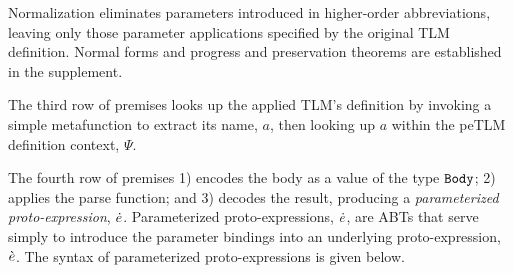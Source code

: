 \documentclass[acmsmall,review,anonymous]{acmart}\settopmatter{printfolios=true,printccs=false,printacmref=false}
\begin{document}
\vspace{-5px}

Normalization eliminates parameters introduced in higher-order abbreviations, leaving only those parameter applications specified by the original TLM definition. Normal forms and progress and preservation theorems are established in the supplement.

The third row of premises looks up the applied TLM's definition by invoking a simple metafunction to extract its name, $a$, then looking up $a$ within the peTLM definition context, $\Psi$.


The fourth row of premises 1) encodes the body as a value of the type $\mathtt{Body}$; 2) applies the parse function; and 3) decodes the result, producing a \emph{parameterized proto-expression}, $\dot{e}$. Parameterized proto-expressions, $\dot{e}$, are ABTs that serve simply to introduce the parameter bindings into an underlying proto-expression, $\grave{e}$. The syntax of parameterized proto-expressions is given below.
\end{document}
